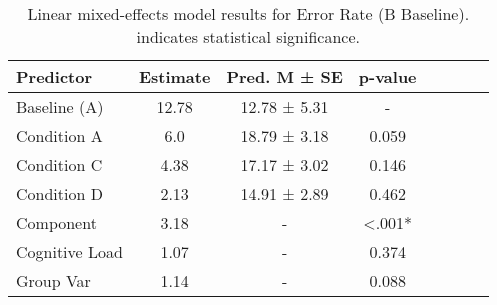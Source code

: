 
    \begin{table}[H]
    \centering
    \begin{small}
    \begin{tabular}{lccccccc}
\toprule
Predictor & Estimate & Pred. M ± SE & p-value \\
\midrule
Baseline (A) & 12.78 & 12.78 ± 5.31 & - \\
Condition A & 6.0 & 18.79 ± 3.18 & 0.059 \\
Condition C & 4.38 & 17.17 ± 3.02 & 0.146 \\
Condition D & 2.13 & 14.91 ± 2.89 & 0.462 \\
Component & 3.18 & - & <.001* \\
Cognitive Load & 1.07 & - & 0.374 \\
Group Var & 1.14 & - & 0.088 \\
\bottomrule
\end{tabular}

    \end{small}
    \caption[Linear mixed-effects model results for Error Rate (B Baseline)]{Linear mixed-effects model results for Error Rate (B Baseline). \newline * indicates statistical significance.}
    \label{tab:errorrate (b baseline)}

    \end{table}